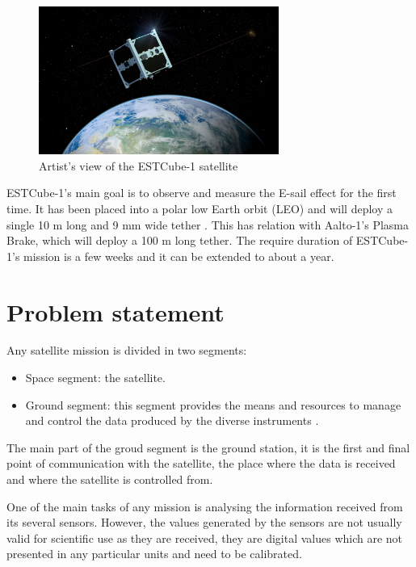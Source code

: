 \begin{figure}[H]
\centerline{\includegraphics[width=0.7\textwidth]{images/ESTCube.jpg}}
\caption{Artist's view of the ESTCube-1 satellite}
\label{f1.5}
\end{figure}

ESTCube-1's main goal is to observe and measure the E-sail effect for the first time. It has been placed into a polar low Earth orbit (LEO) and will deploy a single 10 m long and 9 mm wide tether \cite{ESTCube}. This has relation with Aalto-1's Plasma Brake, which will deploy a 100 m long tether. The require duration of ESTCube-1's mission is a few weeks and it can be extended to about a year.


\section{Problem statement}\label{1.2}

Any satellite mission is divided in two segments:
\begin{itemize}

	\item Space segment: the satellite.
	\item Ground segment: this segment provides the means and resources to manage and control the data produced by the diverse instruments \cite{ESA}. 

\end{itemize}

The main part of the groud segment is the ground station, it is the first and final point of communication with the satellite, the place where the data is received and where the satellite is controlled from.


One of the main tasks of any mission is analysing the information received from its several sensors. However, the values generated by the sensors are not usually valid for scientific use as they are received, they are digital values which are not presented in any particular units and need to be calibrated.\\

